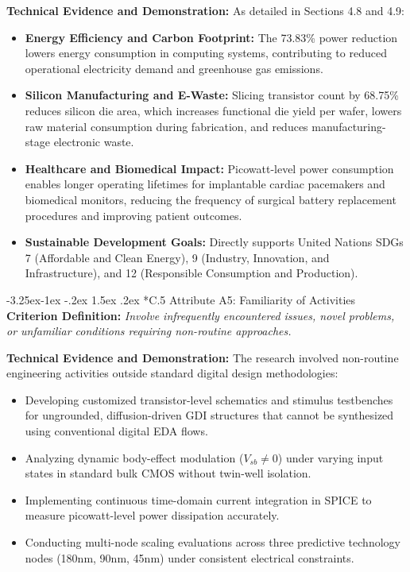 \documentclass[12pt,a4paper,oneside]{report}
\makeatletter
\renewcommand\subsection{\@startsection{subsection}{2}{\z@}%
                                     {-3.25ex\@plus -1ex \@minus -.2ex}%
                                     {1.5ex \@plus .2ex}%
                                     {\normalfont\normalsize\bfseries\itshape}}
\makeatother
\begin{document}
\noindent\textbf{Technical Evidence and Demonstration:}
As detailed in Sections 4.8 and 4.9:
\begin{itemize}
\item \textbf{Energy Efficiency and Carbon Footprint:} The 73.83\% power reduction lowers energy consumption in computing systems, contributing to reduced operational electricity demand and greenhouse gas emissions.
\item \textbf{Silicon Manufacturing and E-Waste:} Slicing transistor count by 68.75\% reduces silicon die area, which increases functional die yield per wafer, lowers raw material consumption during fabrication, and reduces manufacturing-stage electronic waste.
\item \textbf{Healthcare and Biomedical Impact:} Picowatt-level power consumption enables longer operating lifetimes for implantable cardiac pacemakers and biomedical monitors, reducing the frequency of surgical battery replacement procedures and improving patient outcomes.
\item \textbf{Sustainable Development Goals:} Directly supports United Nations SDGs 7 (Affordable and Clean Energy), 9 (Industry, Innovation, and Infrastructure), and 12 (Responsible Consumption and Production).
\end{itemize}

\subsection*{C.5 Attribute A5: Familiarity of Activities}
\textbf{Criterion Definition:} \textit{Involve infrequently encountered issues, novel problems, or unfamiliar conditions requiring non-routine approaches.}

\noindent\textbf{Technical Evidence and Demonstration:}
The research involved non-routine engineering activities outside standard digital design methodologies:
\begin{itemize}
\item Developing customized transistor-level schematics and stimulus testbenches for ungrounded, diffusion-driven GDI structures that cannot be synthesized using conventional digital EDA flows.
\item Analyzing dynamic body-effect modulation ($V_{sb} \neq 0$) under varying input states in standard bulk CMOS without twin-well isolation.
\item Implementing continuous time-domain current integration in SPICE to measure picowatt-level power dissipation accurately.
\item Conducting multi-node scaling evaluations across three predictive technology nodes (180nm, 90nm, 45nm) under consistent electrical constraints.
\end{itemize}
\end{document}
